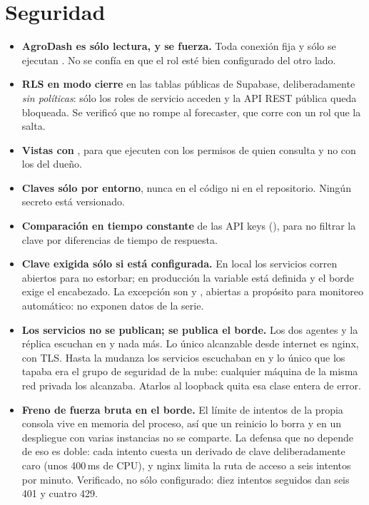 \section{Seguridad}

\begin{itemize}[leftmargin=*,itemsep=4pt]
  \item \textbf{AgroDash es sólo lectura, y se fuerza.} Toda conexión fija
     y sólo se ejecutan
    . No se confía en que el rol esté bien configurado del otro lado.

  \item \textbf{RLS en modo cierre} en las tablas públicas de Supabase, deliberadamente
    \emph{sin políticas}: sólo los roles de servicio acceden y la API REST pública queda
    bloqueada. Se verificó que no rompe al forecaster, que corre con un rol que la
    salta.

  \item \textbf{Vistas con }, para que ejecuten con los permisos de
    quien consulta y no con los del dueño.

  \item \textbf{Claves sólo por entorno}, nunca en el código ni en el repositorio.
    Ningún secreto está versionado.

  \item \textbf{Comparación en tiempo constante} de las API keys
    (), para no filtrar la clave por diferencias de tiempo de
    respuesta.

  \item \textbf{Clave exigida sólo si está configurada.} En local los servicios corren
    abiertos para no estorbar; en producción la variable está definida y el borde exige
    el encabezado. La excepción son  y , abiertas a
    propósito para monitoreo automático: no exponen datos de la serie.

  \item \textbf{Los servicios no se publican; se publica el borde.} Los dos agentes y la
    réplica escuchan en  y nada más. Lo único alcanzable desde internet es
    nginx, con TLS. Hasta la mudanza los servicios escuchaban en  y lo único
    que los tapaba era el grupo de seguridad de la nube: cualquier máquina de la misma
    red privada los alcanzaba. Atarlos al loopback quita esa clase entera de error.

  \item \textbf{Freno de fuerza bruta en el borde.} El límite de intentos de la propia
    consola vive en memoria del proceso, así que un reinicio lo borra y en un despliegue
    con varias instancias no se comparte. La defensa que no depende de eso es doble: cada
    intento cuesta un derivado de clave deliberadamente caro (unos 400\,ms de CPU), y
    nginx limita la ruta de acceso a seis intentos por minuto. Verificado, no sólo
    configurado: diez intentos seguidos dan seis 401 y cuatro 429.


\end{itemize}
